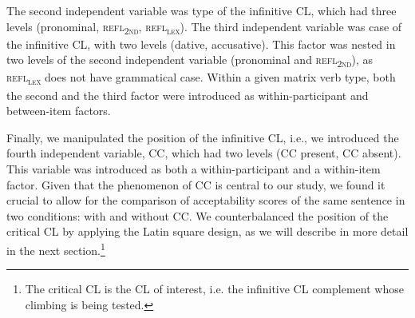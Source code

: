 The second independent variable was type of the infinitive CL, which had three levels (pronominal, \textsc{refl\textsubscript{2nd}}, \textsc{refl\textsubscript{\textsc{lex}}}). The third independent variable was case of the infinitive CL, with two levels (dative, accusative). This factor was nested in two levels of the second independent variable (pronominal and \textsc{refl\textsubscript{2nd}}), as \textsc{refl\textsubscript{\textsc{lex}}} does not have grammatical case. Within a given matrix verb type, both the second and the third factor were introduced as within-participant and between-item factors. 

Finally, we manipulated the position of the infinitive CL, i.e., we introduced the fourth independent variable, CC, which had two levels (CC present, CC absent). This variable was introduced as both a within-participant and a within-item factor. Given that the phenomenon of CC is central to our study, we found it crucial to allow for the comparison of acceptability scores of the same sentence in two conditions: with and without CC. We counterbalanced the position of the critical CL by applying the Latin square design, as we will describe in more detail in the next section.\footnote{The critical CL is the CL of interest, i.e. the infinitive CL complement whose climbing is being tested.}

